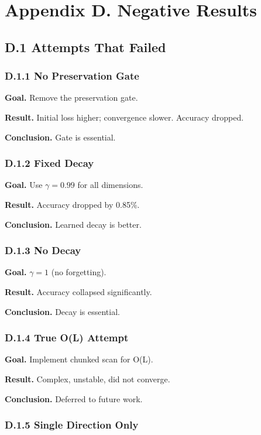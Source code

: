 \section{Appendix D. Negative Results}

\subsection{D.1 Attempts That Failed}

\subsubsection{D.1.1 No Preservation Gate}

\textbf{Goal.} Remove the preservation gate.

\textbf{Result.} Initial loss higher; convergence slower. Accuracy dropped.

\textbf{Conclusion.} Gate is essential.

\subsubsection{D.1.2 Fixed Decay}

\textbf{Goal.} Use $\gamma = 0.99$ for all dimensions.

\textbf{Result.} Accuracy dropped by 0.85\%.

\textbf{Conclusion.} Learned decay is better.

\subsubsection{D.1.3 No Decay}

\textbf{Goal.} $\gamma = 1$ (no forgetting).

\textbf{Result.} Accuracy collapsed significantly.

\textbf{Conclusion.} Decay is essential.

\subsubsection{D.1.4 True O(L) Attempt}

\textbf{Goal.} Implement chunked scan for O(L).

\textbf{Result.} Complex, unstable, did not converge.

\textbf{Conclusion.} Deferred to future work.

\subsubsection{D.1.5 Single Direction Only}

